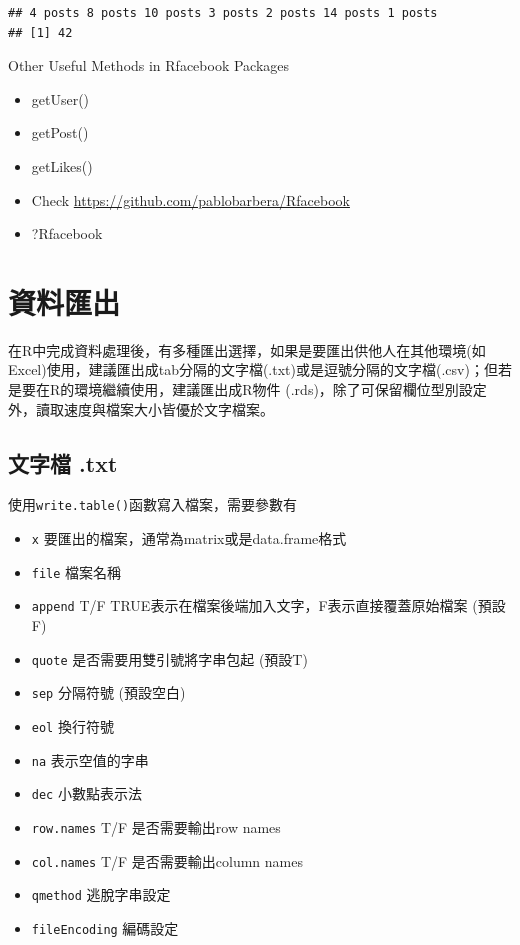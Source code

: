 \documentclass[]{book}
\providecommand{\tightlist}{%
  \setlength{\itemsep}{0pt}\setlength{\parskip}{0pt}}
\theoremstyle{definition}
\theoremstyle{definition}
\theoremstyle{remark}
\begin{document}
\begin{verbatim}
## 4 posts 8 posts 10 posts 3 posts 2 posts 14 posts 1 posts
## [1] 42
\end{verbatim}

Other Useful Methods in Rfacebook Packages

\begin{itemize}
\tightlist
\item
  getUser()
\item
  getPost()
\item
  getLikes()
\item
  Check \url{https://github.com/pablobarbera/Rfacebook}
\item
  ?Rfacebook
\end{itemize}

\section{資料匯出}

在R中完成資料處理後，有多種匯出選擇，如果是要匯出供他人在其他環境(如Excel)使用，建議匯出成tab分隔的文字檔(.txt)或是逗號分隔的文字檔(.csv)；但若是要在R的環境繼續使用，建議匯出成R物件
(.rds)，除了可保留欄位型別設定外，讀取速度與檔案大小皆優於文字檔案。

\subsection{文字檔 .txt}\label{-.txt}

使用\texttt{write.table()}函數寫入檔案，需要參數有

\begin{itemize}
\tightlist
\item
  \texttt{x} 要匯出的檔案，通常為matrix或是data.frame格式
\item
  \texttt{file} 檔案名稱
\item
  \texttt{append} T/F TRUE表示在檔案後端加入文字，F表示直接覆蓋原始檔案
  (預設F)
\item
  \texttt{quote} 是否需要用雙引號將字串包起 (預設T)
\item
  \texttt{sep} 分隔符號 (預設空白)
\item
  \texttt{eol} 換行符號
\item
  \texttt{na} 表示空值的字串
\item
  \texttt{dec} 小數點表示法
\item
  \texttt{row.names} T/F 是否需要輸出row names
\item
  \texttt{col.names} T/F 是否需要輸出column names
\item
  \texttt{qmethod} 逃脫字串設定
\item
  \texttt{fileEncoding} 編碼設定
\end{itemize}
\end{document}

